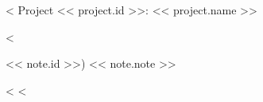 \documentclass[a4paper]{amsart}
\begin{document}
<%
Project << project.id >>: << project.name >>

<%

<< note.id >>) << note.note >>

<%
<%
\end{document}
